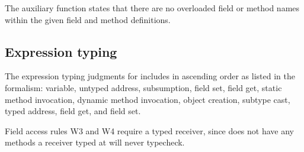\documentclass[acmlarge, anonymous, authordraft]{acmart}
\begin{document}
The  auxiliary function states that there are no overloaded 
field or method names within the given field and method definitions. \\

\begin{mathpar}

\end{mathpar}

\begin{mathpar}
\end{mathpar}
 
\begin{mathpar}

\end{mathpar}

\begin{mathpar}
\end{mathpar}

\subsection{Expression typing}

The expression typing judgments for \kafka includes in ascending order as listed in the formalism:
variable, untyped address, subsumption, field set, field get, static method invocation, dynamic method invocation, object creation,
subtype cast,
typed address,  field get, and  field set.

Field access rules W3 and W4 require a typed receiver, since \any does not
have any methods a receiver typed at \any will never typecheck.
\end{document}
